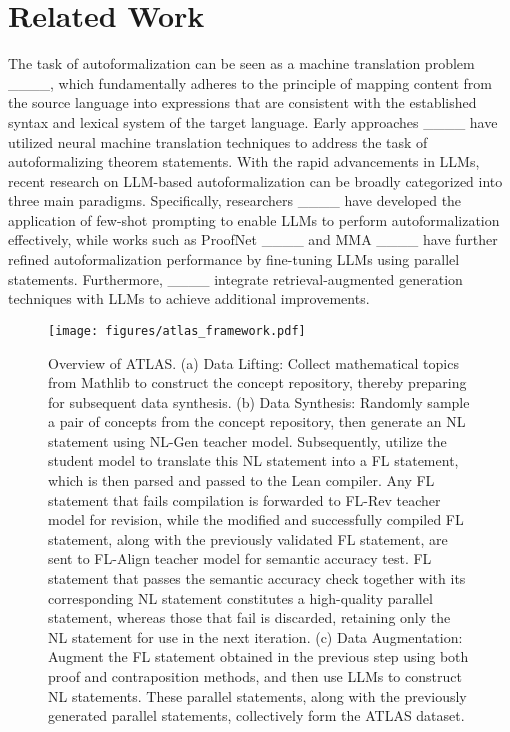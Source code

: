 \section{Related Work}
The task of autoformalization can be seen as a machine translation problem ____, which fundamentally adheres to the principle of mapping content from the source language into expressions that are consistent with the established syntax and lexical system of the target language. Early approaches ____ have utilized neural machine translation techniques to address the task of autoformalizing theorem statements. With the rapid advancements in LLMs, recent research on LLM-based autoformalization can be broadly categorized into three main paradigms. Specifically, researchers ____ have developed the application of few-shot prompting to enable LLMs to perform autoformalization effectively, while works such as ProofNet ____ and MMA ____ have further refined autoformalization performance by fine-tuning LLMs using parallel statements. Furthermore, ____ integrate retrieval-augmented generation techniques with LLMs to achieve additional improvements. 

\begin{figure*}[!htbp]
\centering
\texttt{[image: figures/atlas\_framework.pdf]}
\caption{Overview of ATLAS. (a) Data Lifting: Collect mathematical topics from Mathlib to construct the concept repository, thereby preparing for subsequent data synthesis. (b) Data Synthesis: Randomly sample a pair of concepts from the concept repository, then generate an NL statement using NL-Gen teacher model. Subsequently, utilize the student model to translate this NL statement into a FL statement, which is then parsed and passed to the Lean compiler. Any FL statement that fails compilation is forwarded to FL-Rev teacher model for revision, while the modified and successfully compiled FL statement, along with the previously validated FL statement, are sent to FL-Align teacher model for semantic accuracy test. FL statement that passes the semantic accuracy check together with its corresponding NL statement constitutes a high-quality parallel statement, whereas those that fail is discarded, retaining only the NL statement for use in the next iteration. (c) Data Augmentation: Augment the FL statement obtained in the previous step using both proof and contraposition methods, and then use LLMs to construct NL statements. These parallel statements, along with the previously generated parallel statements, collectively form the ATLAS dataset.}
\label{fig:framework}
\end{figure*}

